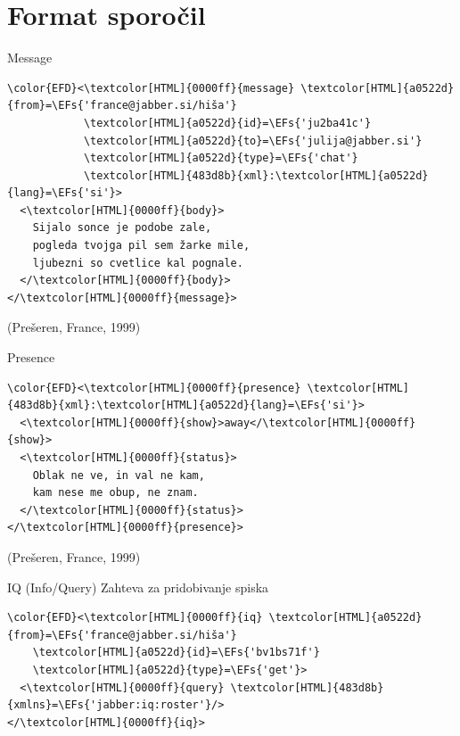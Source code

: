 \documentclass[presentation]{beamer}
\newcommand{\EFs}[1]{\textcolor{EFs}{#1}} %
\begin{document}
\section{Format sporočil}
\label{sec:orgf41f4a2}

\begin{frame}[label={sec:org86e2948},fragile]{Message}
 \begin{Code}
\begin{Verbatim}
\color{EFD}<\textcolor[HTML]{0000ff}{message} \textcolor[HTML]{a0522d}{from}=\EFs{'france@jabber.si/hiša'}
            \textcolor[HTML]{a0522d}{id}=\EFs{'ju2ba41c'}
            \textcolor[HTML]{a0522d}{to}=\EFs{'julija@jabber.si'}
            \textcolor[HTML]{a0522d}{type}=\EFs{'chat'}
            \textcolor[HTML]{483d8b}{xml}:\textcolor[HTML]{a0522d}{lang}=\EFs{'si'}>
  <\textcolor[HTML]{0000ff}{body}>
    Sijalo sonce je podobe zale,
    pogleda tvojga pil sem žarke mile,
    ljubezni so cvetlice kal pognale.
  </\textcolor[HTML]{0000ff}{body}>
</\textcolor[HTML]{0000ff}{message}>
\end{Verbatim}
\end{Code}

(Prešeren, France, 1999)
\end{frame}

\begin{frame}[label={sec:org2cbe184},fragile]{Presence}
 \begin{Code}
\begin{Verbatim}
\color{EFD}<\textcolor[HTML]{0000ff}{presence} \textcolor[HTML]{483d8b}{xml}:\textcolor[HTML]{a0522d}{lang}=\EFs{'si'}>
  <\textcolor[HTML]{0000ff}{show}>away</\textcolor[HTML]{0000ff}{show}>
  <\textcolor[HTML]{0000ff}{status}>
    Oblak ne ve, in val ne kam,
    kam nese me obup, ne znam.
  </\textcolor[HTML]{0000ff}{status}>
</\textcolor[HTML]{0000ff}{presence}>
\end{Verbatim}
\end{Code}

(Prešeren, France, 1999)
\end{frame}

\begin{frame}[label={sec:org974c2f8},fragile]{IQ (Info/Query)}
 Zahteva za pridobivanje spiska

\begin{Code}
\begin{Verbatim}
\color{EFD}<\textcolor[HTML]{0000ff}{iq} \textcolor[HTML]{a0522d}{from}=\EFs{'france@jabber.si/hiša'}
    \textcolor[HTML]{a0522d}{id}=\EFs{'bv1bs71f'}
    \textcolor[HTML]{a0522d}{type}=\EFs{'get'}>
  <\textcolor[HTML]{0000ff}{query} \textcolor[HTML]{483d8b}{xmlns}=\EFs{'jabber:iq:roster'}/>
</\textcolor[HTML]{0000ff}{iq}>
\end{Verbatim}
\end{Code}
\end{frame}
\end{document}
